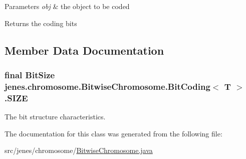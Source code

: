 \begin{DoxyParams}{Parameters}
{\em obj} & the object to be coded \\
\hline
\end{DoxyParams}
\begin{DoxyReturn}{Returns}
the coding bits 
\end{DoxyReturn}


\subsection{Member Data Documentation}
\hypertarget{classjenes_1_1chromosome_1_1_bitwise_chromosome_1_1_bit_coding_3_01_t_01_4_a9e0438de596fe3dcc0f789a7bd975330}{
\subsubsection[{S\-I\-Z\-E}]{\setlength{\rightskip}{0pt plus 5cm}final {\bf Bit\-Size} jenes.\-chromosome.\-Bitwise\-Chromosome.\-Bit\-Coding$<$ T $>$.S\-I\-Z\-E}}\label{classjenes_1_1chromosome_1_1_bitwise_chromosome_1_1_bit_coding_3_01_t_01_4_a9e0438de596fe3dcc0f789a7bd975330}
The bit structure characteristics. 

The documentation for this class was generated from the following file\-:\begin{DoxyCompactItemize}
\item 
src/jenes/chromosome/\hyperlink{_bitwise_chromosome_8java}{Bitwise\-Chromosome.\-java}\end{DoxyCompactItemize}
